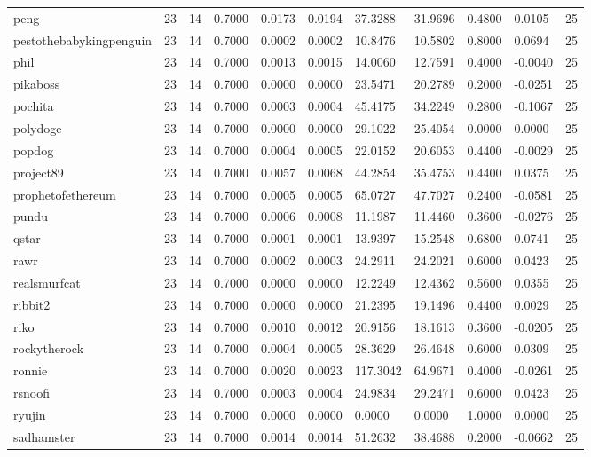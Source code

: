 \begin{table}[htbp]
\begin{tabular}{lllllllllll}
peng & 23 & 14 & 0.7000 & 0.0173 & 0.0194 & 37.3288 & 31.9696 & 0.4800 & 0.0105 & 25 \\
pestothebabykingpenguin & 23 & 14 & 0.7000 & 0.0002 & 0.0002 & 10.8476 & 10.5802 & 0.8000 & 0.0694 & 25 \\
phil & 23 & 14 & 0.7000 & 0.0013 & 0.0015 & 14.0060 & 12.7591 & 0.4000 & -0.0040 & 25 \\
pikaboss & 23 & 14 & 0.7000 & 0.0000 & 0.0000 & 23.5471 & 20.2789 & 0.2000 & -0.0251 & 25 \\
pochita & 23 & 14 & 0.7000 & 0.0003 & 0.0004 & 45.4175 & 34.2249 & 0.2800 & -0.1067 & 25 \\
polydoge & 23 & 14 & 0.7000 & 0.0000 & 0.0000 & 29.1022 & 25.4054 & 0.0000 & 0.0000 & 25 \\
popdog & 23 & 14 & 0.7000 & 0.0004 & 0.0005 & 22.0152 & 20.6053 & 0.4400 & -0.0029 & 25 \\
project89 & 23 & 14 & 0.7000 & 0.0057 & 0.0068 & 44.2854 & 35.4753 & 0.4400 & 0.0375 & 25 \\
prophetofethereum & 23 & 14 & 0.7000 & 0.0005 & 0.0005 & 65.0727 & 47.7027 & 0.2400 & -0.0581 & 25 \\
pundu & 23 & 14 & 0.7000 & 0.0006 & 0.0008 & 11.1987 & 11.4460 & 0.3600 & -0.0276 & 25 \\
qstar & 23 & 14 & 0.7000 & 0.0001 & 0.0001 & 13.9397 & 15.2548 & 0.6800 & 0.0741 & 25 \\
rawr & 23 & 14 & 0.7000 & 0.0002 & 0.0003 & 24.2911 & 24.2021 & 0.6000 & 0.0423 & 25 \\
realsmurfcat & 23 & 14 & 0.7000 & 0.0000 & 0.0000 & 12.2249 & 12.4362 & 0.5600 & 0.0355 & 25 \\
ribbit2 & 23 & 14 & 0.7000 & 0.0000 & 0.0000 & 21.2395 & 19.1496 & 0.4400 & 0.0029 & 25 \\
riko & 23 & 14 & 0.7000 & 0.0010 & 0.0012 & 20.9156 & 18.1613 & 0.3600 & -0.0205 & 25 \\
rockytherock & 23 & 14 & 0.7000 & 0.0004 & 0.0005 & 28.3629 & 26.4648 & 0.6000 & 0.0309 & 25 \\
ronnie & 23 & 14 & 0.7000 & 0.0020 & 0.0023 & 117.3042 & 64.9671 & 0.4000 & -0.0261 & 25 \\
rsnoofi & 23 & 14 & 0.7000 & 0.0003 & 0.0004 & 24.9834 & 29.2471 & 0.6000 & 0.0423 & 25 \\
ryujin & 23 & 14 & 0.7000 & 0.0000 & 0.0000 & 0.0000 & 0.0000 & 1.0000 & 0.0000 & 25 \\
sadhamster & 23 & 14 & 0.7000 & 0.0014 & 0.0014 & 51.2632 & 38.4688 & 0.2000 & -0.0662 & 25 \\

\end{tabular}
\end{table}
